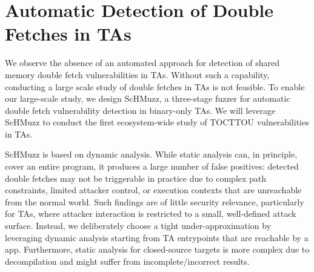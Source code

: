 \documentclass[conference]{IEEEtran}
\newcommand{\sysname}{ScHMuzz\xspace}
\begin{document}
\section{Automatic Detection of Double Fetches in TAs}\label{sec:design} 


We observe the absence of an automated approach for detection of shared memory double fetch 
vulnerabilities in TAs. Without such a capability, conducting a large scale study of 
double fetches in TAs is not feasible. 
To enable our large-scale study, we design \sysname, a three-stage fuzzer 
for automatic double fetch vulnerability detection in binary-only TAs. 
We will leverage \sysname to conduct the first ecosystem-wide study of TOCTTOU 
vulnerabilities in TAs.

\sysname is based on dynamic analysis. While static analysis can, in principle, cover an 
entire program, it produces a large number of false positives: detected double fetches 
may not be triggerable in practice due to complex path constraints, limited attacker 
control, or execution contexts that are unreachable from the normal world. Such findings 
are of little security relevance, particularly for TAs, where attacker interaction is 
restricted to a small, well-defined attack surface. Instead, we deliberately choose a 
tight under-approximation by leveraging dynamic analysis starting from TA entrypoints 
that are reachable by a app. Furthermore, static analysis for closed-source targets is more 
complex due to decompilation and might suffer from incomplete/incorrect results.
\end{document}

